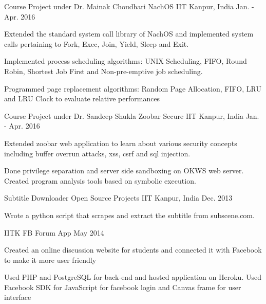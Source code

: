 \begin{cventries}
	\cventry
	{Course Project under Dr. Mainak Choudhari} %
	{NachOS} %
	{IIT Kanpur, India} %
	{Jan. - Apr. 2016} %
	{
		\begin{cvitems} %
			\item Extended the standard system call library of NachOS and implemented system calls pertaining to Fork, Exec, Join, Yield, Sleep and Exit.
			\item Implemented process scheduling algorithms: UNIX Scheduling, FIFO, Round Robin, Shortest Job First and Non-pre-emptive job scheduling.
			\item Programmed page replacement algorithms: Random Page Allocation, FIFO, LRU and LRU Clock to evaluate relative performances
		\end{cvitems}
	}
	\cventry
	{Course Project under Dr. Sandeep Shukla} %
	{Zoobar Secure} %
	{IIT Kanpur, India} %
	{Jan. - Apr. 2016} %
	{
		\begin{cvitems} %
			\item Extended zoobar web application to learn about various security concepts including buffer overrun attacks, xss, csrf and sql injection.
			\item Done privilege separation and server side sandboxing on OKWS web server. Created program analysis tools based on symbolic execution.
		\end{cvitems}
	}
	
	\cventry
	{Subtitle Downloader} %
	{Open Source Projects} %
	{IIT Kanpur, India} %
	{Dec. 2013} %
	{
		\begin{cvitems} %
			\item Wrote a python script that scrapes and extract the subtitle from subscene.com.
		\end{cvitems}
	}
	
	\cventry
	{IITK FB Forum App} %
	{} %
	{} %
	{May 2014} %
	{
		\begin{cvitems} %
			\item Created an online discussion website for students and connected it with Facebook to make it more user friendly
			\item Used PHP and PostgreSQL for back-end and hosted application on Heroku. Used Facebook SDK for JavaScript for facebook login and Canvas frame for user interface
		\end{cvitems}
	}
\end{cventries}